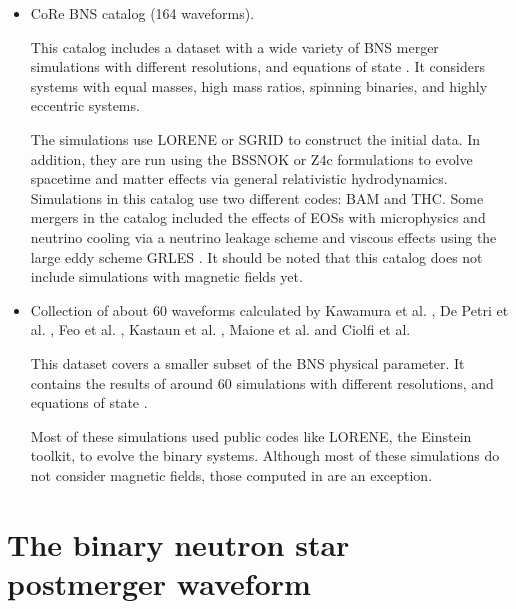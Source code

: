 \begin{itemize}[leftmargin=*]

\item CoRe BNS catalog \cite{Dietrich:2018phi} (164 waveforms).

This catalog includes a dataset with a wide variety of BNS merger simulations with different resolutions, and equations of state \cite{Banik_2014,Steiner:2012rk,PhysRevD.79.124032}. It considers systems with equal masses, high mass ratios, spinning binaries, and highly eccentric systems.

The simulations use LORENE or SGRID to construct the initial data. In addition, they are run using the BSSNOK \cite{PhysRevD.52.5428,1987PThPS..90....1N,Bernuzzi_2010} or Z4c \cite{Ruiz_2011,Weyhausen_2012,Hilditch_2013} formulations to evolve spacetime and matter effects via general relativistic hydrodynamics. Simulations in this catalog use two different codes: BAM and THC. Some mergers in the catalog included the effects of EOSs with microphysics and neutrino cooling via a neutrino leakage scheme and viscous effects using the large eddy scheme GRLES \cite{Radice_2017}. It should be noted that this catalog does not include simulations with magnetic fields yet.

\item Collection of about 60 waveforms calculated by Kawamura et al. \cite{Kawamura:2016nmk}, De Petri et al. \cite{DePietri:2018tpx,DePietri:2015lya}, Feo et al. \cite{Feo:2016cbs}, Kastaun et al. \cite{Kastaun:2016elu}, Maione et al. \cite{Maione:2016zqz,Maione:2017aux} and Ciolfi et al. \cite{Ciolfi:2017uak}

This dataset covers a smaller subset of the BNS physical parameter. It contains the results of around 60 simulations with different resolutions, and equations of state \cite{PhysRevC.82.015806,PhysRevC.83.035802,PhysRevC.58.1804,PhysRevD.79.124032,PhysRevLett.67.2414,PhysRevC.52.2072}.

Most of these simulations used public codes like LORENE, the Einstein toolkit, to evolve the binary systems. Although most of these simulations do not consider magnetic fields, those computed in \cite{Kawamura:2016nmk,Ciolfi:2017uak} are an exception. 

\end{itemize}



\section{The binary neutron star postmerger waveform}

